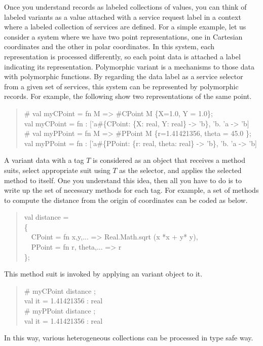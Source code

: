 \documentclass{jbook}
\newcommand{\myem}{\mbox{\ \ }}
\newenvironment{program}{\begin{quote}\begin{tt}}%
                        {\end{tt}\end{quote}}
\begin{document}
	Once you understand records as labeled collections of values,
you can think of labeled variants as a value attached with a service 
request label in a context where a labeled collection of services are
defined. 
	For a simple example, let us consider a system where we have two
point representations, one in Cartesian coordinates and the other in
polar coordinates.
	In this system, each representation is processed differently, so
each point data is attached a label indicating its representation.
	Polymorphic variant is a mechanisms to those data with
polymorphic functions.
	By regarding the data label as a service selector from a given
set of services, this system can be represented by polymorphic records.
	For example, the following show two representations of the same
point.
\begin{tt}\begin{quote}
\# val myCPoint = fn M => \#CPoint M \{X=1.0, Y = 1.0\};\\
val myCPoint = fn : ['a\#\{CPoint: \{X: real, Y: real\} -> 'b\}, 'b. 'a -> 'b]\\
\# val myPPoint = fn M => \#PPoint M \{r=1.41421356, theta = 45.0 \};\\
val myPPoint = fn : ['a\#\{PPoint: \{r: real, theta: real\} -> 'b\}, 'b. 'a -> 'b]
\end{quote}\end{tt}
	A variant data with a tag $T$ is considered as an object that
receives a method suits, select appropriate suit using $T$ as the
selector, and applies the selected method to itself.
	One you understand this idea, then all you have to do is to
write up the set of necessary methods for each tag.
	For example, a set of methods to compute the distance from the
origin of coordinates can be coded as below.
\begin{program}
val distance = \\
\{\\
\myem CPoint = fn {x,y,...} => Real.Math.sqrt (x *x + y* y),\\
\myem PPoint = fn {r, theta,...} => r\\
\};
\end{program}
	This method suit is invoked by applying an variant object to it.
\begin{tt}\begin{quote}
\# myCPoint distance ;\\
val it = 1.41421356 : real\\
\# myPPoint distance ;\\
val it = 1.41421356 : real
\end{quote}\end{tt}
	In this way, various heterogeneous collections can be processed
in type safe way.
\fi%
\end{document}
